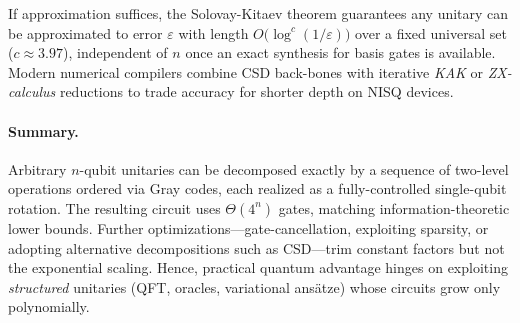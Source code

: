 If approximation suffices, the Solovay-Kitaev theorem guarantees any unitary can be approximated to error $\varepsilon$ with length $O\!\bigl(\log^{c}(1/\varepsilon)\bigr)$ over a fixed universal set ($c\!\approx\!3.97$), independent of $n$ once an exact synthesis for basis gates is available.\cite{Dawson2005solovay} Modern numerical compilers combine CSD back-bones with iterative \emph{KAK} or \emph{ZX-calculus} reductions to trade accuracy for shorter depth on NISQ devices.\cite{Heyfron2018zx}

\paragraph{Summary.} 
Arbitrary $n$-qubit unitaries can be decomposed exactly by a sequence of two-level operations ordered via Gray codes, each realized as a fully-controlled single-qubit rotation.\cite{fedoriaka2025decomposition} The resulting circuit uses $\Theta(4^{n})$ gates, matching information-theoretic lower bounds.\cite{Shende2006synthesis} Further optimizations—gate-cancellation, exploiting sparsity, or adopting alternative decompositions such as CSD—trim constant factors but not the exponential scaling. Hence, practical quantum advantage hinges on exploiting \emph{structured} unitaries (QFT, oracles, variational ansätze) whose circuits grow only polynomially.\cite{Preskill2018nisq}
